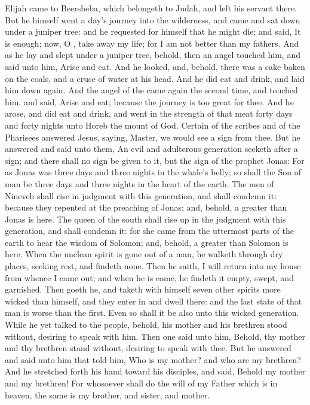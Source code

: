  Elijah came to Beersheba, which belongeth to Judah, and left his servant there. But he himself went a day's journey into the wilderness, and came and sat down under a juniper tree: and he requested for himself that he might die; and said, It is enough; now, O , take away my life; for I am not better than my fathers. And as he lay and slept under a juniper tree, behold, then an angel touched him, and said unto him, Arise and eat. And he looked, and, behold, there was a cake baken on the coals, and a cruse of water at his head. And he did eat and drink, and laid him down again. And the angel of the  came again the second time, and touched him, and said, Arise and eat; because the journey is too great for thee. And he arose, and did eat and drink, and went in the strength of that meat forty days and forty nights unto Horeb the mount of God.
 Certain of the scribes and of the Pharisees answered Jesus, saying, Master, we would see a sign from thee. But he answered and said unto them, An evil and adulterous generation seeketh after a sign; and there shall no sign be given to it, but the sign of the prophet Jonas: For as Jonas was three days and three nights in the whale's belly; so shall the Son of man be three days and three nights in the heart of the earth. The men of Nineveh shall rise in judgment with this generation, and shall condemn it: because they repented at the preaching of Jonas; and, behold, a greater than Jonas is here. The queen of the south shall rise up in the judgment with this generation, and shall condemn it: for she came from the uttermost parts of the earth to hear the wisdom of Solomon; and, behold, a greater than Solomon is here. When the unclean spirit is gone out of a man, he walketh through dry places, seeking rest, and findeth none. Then he saith, I will return into my house from whence I came out; and when he is come, he findeth it empty, swept, and garnished. Then goeth he, and taketh with himself seven other spirits more wicked than himself, and they enter in and dwell there: and the last state of that man is worse than the first. Even so shall it be also unto this wicked generation. While he yet talked to the people, behold, his mother and his brethren stood without, desiring to speak with him. Then one said unto him, Behold, thy mother and thy brethren stand without, desiring to speak with thee. But he answered and said unto him that told him, Who is my mother? and who are my brethren? And he stretched forth his hand toward his disciples, and said, Behold my mother and my brethren! For whosoever shall do the will of my Father which is in heaven, the same is my brother, and sister, and mother.
